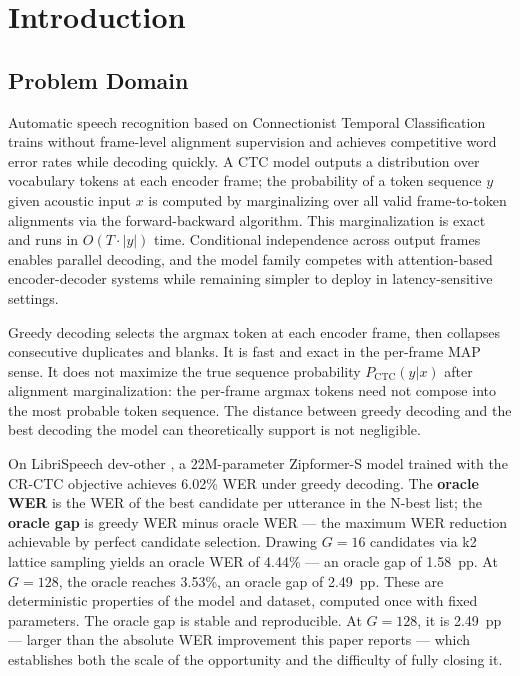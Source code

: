 \section{Introduction}
\label{sec:intro}

\subsection{Problem Domain}

Automatic speech recognition based on Connectionist Temporal Classification \cite{graves2006ctc} trains without frame-level alignment supervision and achieves competitive word error rates while decoding quickly. A CTC model outputs a distribution over vocabulary tokens at each encoder frame; the probability of a token sequence $y$ given acoustic input $x$ is computed by marginalizing over all valid frame-to-token alignments via the forward-backward algorithm. This marginalization is exact and runs in $O(T \cdot |y|)$ time. Conditional independence across output frames enables parallel decoding, and the model family competes with attention-based encoder-decoder systems while remaining simpler to deploy in latency-sensitive settings.

Greedy decoding selects the argmax token at each encoder frame, then collapses consecutive duplicates and blanks. It is fast and exact in the per-frame MAP sense. It does not maximize the true sequence probability $P_\text{CTC}(y|x)$ after alignment marginalization: the per-frame argmax tokens need not compose into the most probable token sequence. The distance between greedy decoding and the best decoding the model can theoretically support is not negligible.

On LibriSpeech dev-other \cite{panayotov2015librispeech}, a 22M-parameter Zipformer-S model \cite{yao2024zipformer} trained with the CR-CTC objective \cite{huang2024crctc} achieves 6.02\% WER under greedy decoding. The \textbf{oracle WER} is the WER of the best candidate per utterance in the N-best list; the \textbf{oracle gap} is greedy WER minus oracle WER — the maximum WER reduction achievable by perfect candidate selection. Drawing $G=16$ candidates via k2 lattice sampling \cite{li2022k2} yields an oracle WER of 4.44\% — an oracle gap of 1.58~pp. At $G=128$, the oracle reaches 3.53\%, an oracle gap of 2.49~pp. These are deterministic properties of the model and dataset, computed once with fixed parameters. The oracle gap is stable and reproducible. At $G=128$, it is 2.49~pp — larger than the absolute WER improvement this paper reports — which establishes both the scale of the opportunity and the difficulty of fully closing it.

